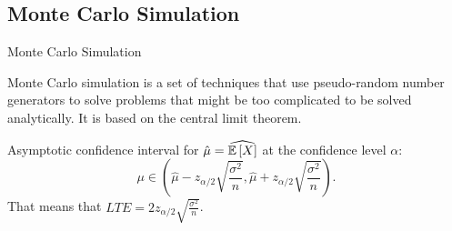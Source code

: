 \subsection{Monte Carlo Simulation}
    \begin{frame}{Monte Carlo Simulation}
        \begin{definition}
            Monte Carlo simulation is a set of techniques that use pseudo-random number generators to solve problems that might be too complicated to be solved analytically. It is based on the central limit theorem.
        \end{definition}
        Asymptotic confidence interval for $\hat{\mu} = \widehat{\mathbb{E}\left[X\right]}$ at the confidence level $\alpha$:
        \begin{equation}
            \mu \in \left(\hat{\mu} - z_{\alpha/2} \sqrt{\frac{\sigma^2}{n}}, \hat{\mu} + z_{\alpha/2} \sqrt{\frac{\sigma^2}{n}}\right).
        \end{equation}
        That means that $LTE = 2z_{\alpha/2} \sqrt{\frac{\sigma^2}{n}}$.
    \end{frame}
